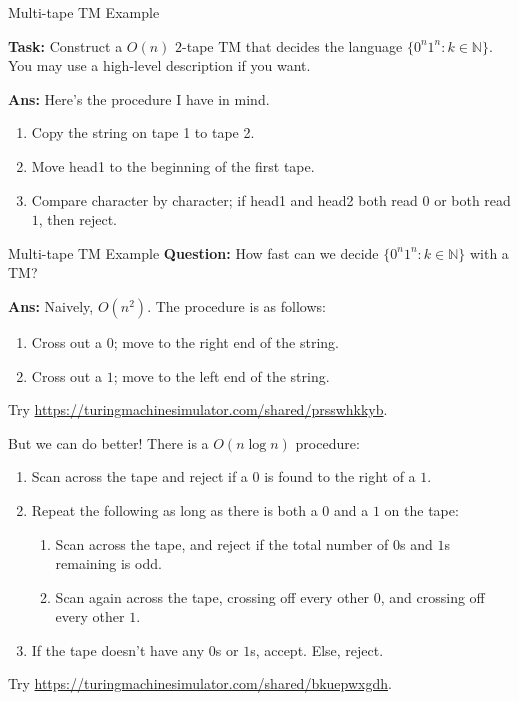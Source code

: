 \documentclass{beamer}
\newcommand{\N}{{\mathbb N}}
\begin{document}
\begin{frame}{Multi-tape TM Example}

\textbf{Task:} Construct a $O(n)$ $2$-tape TM that decides the language $\{0^n 1^n: k \in \N\}$. You may use a high-level description if you want.

\pause

\textbf{Ans:} Here's the procedure I have in mind.

\begin{enumerate}
    \item Copy the string on tape 1 to tape 2.
    \item Move head1 to the beginning of the first tape. 
    \item Compare character by character; if head1 and head2 both read $0$ or both read $1$, then reject.
\end{enumerate}

\end{frame}

\begin{frame}{Multi-tape TM Example}
\textbf{Question:} How fast can we decide $\{0^n 1^n: k \in \N\}$ with a TM?

\pause

\textbf{Ans:} Naively, $O(n^2)$. The procedure is as follows:
\begin{enumerate}
    \item Cross out a $0$; move to the right end of the string.
    \item Cross out a $1$; move to the left end of the string.
\end{enumerate}
Try \url{https://turingmachinesimulator.com/shared/prsswhkkyb}.

\vspace{2mm} \pause

But we can do better! There is a $O(n \log n)$ procedure:

\pause

\begin{enumerate}
    \item Scan across the tape and reject if a $0$ is found to the right of a $1$.
    \item Repeat the following as long as there is both a $0$ and a $1$ on the tape:
    \begin{enumerate}
        \item Scan across the tape, and reject if the total number of $0$s and $1$s remaining is odd.
        \item Scan again across the tape, crossing off every other $0$, and crossing off every other $1$.
    \end{enumerate}
    \item If the tape doesn't have any $0$s or $1$s, accept. Else, reject.
\end{enumerate}

\pause

Try \url{https://turingmachinesimulator.com/shared/bkuepwxgdh}.

\end{frame}
\end{document}
